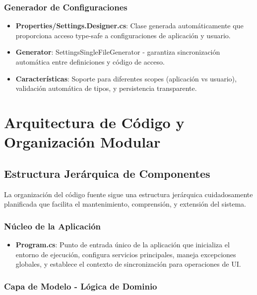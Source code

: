 \documentclass[a4paper]{article}
\begin{document}
\subsubsection{Generador de Configuraciones}

\begin{itemize}
\item \textbf{Properties/Settings.Designer.cs}: Clase generada automáticamente que proporciona acceso type-safe a configuraciones de aplicación y usuario.

\item \textbf{Generator}: SettingsSingleFileGenerator - garantiza sincronización automática entre definiciones y código de acceso.

\item \textbf{Características}: Soporte para diferentes scopes (aplicación vs usuario), validación automática de tipos, y persistencia transparente.
\end{itemize}

\section{Arquitectura de Código y Organización Modular}

\subsection{Estructura Jerárquica de Componentes}

La organización del código fuente sigue una estructura jerárquica cuidadosamente planificada que facilita el mantenimiento, comprensión, y extensión del sistema.

\subsubsection{Núcleo de la Aplicación}

\begin{itemize}
\item \textbf{Program.cs}: Punto de entrada único de la aplicación que inicializa el entorno de ejecución, configura servicios principales, maneja excepciones globales, y establece el contexto de sincronización para operaciones de UI.
\end{itemize}

\subsubsection{Capa de Modelo - Lógica de Dominio}
\end{document}
